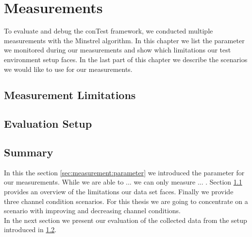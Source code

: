 \chapter{Measurements}
\label{chap:mmeasurement}

To evaluate and debug the conTest framework, we conducted multiple measurements with the Minstrel algorithm. In this chapter we list the parameter we monitored during our measurements and show which limitations our test environment setup faces. In the last part of this chapter we describe the scenarios we would like to use for our measurements.\\

%


\section{Measurement Limitations}
\label{sec:measurement:limits}
%

%

\section{Evaluation Setup}
\label{sec:measurement:eval_setup}
%


%
\newpage
%
 

\section{Summary}

In this the section \ref{sec:measurement:parameter} we introduced the parameter for our measurements. While we are able to ... we can only measure ... . Section \ref{sec:measurement:limits} provides an overview of the limitations our data set faces. Finally we provide three channel condition scenarios. For this thesis we are going to concentrate on a scenario with improving and decreasing channel conditions.\\
In the next section we present our evaluation of the collected data from the setup introduced in \ref{sec:measurement:eval_setup}.\\


%
